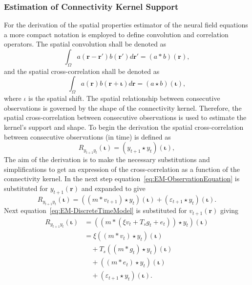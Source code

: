 \documentclass[]{article}
\begin{document}
\subsubsection{Estimation of Connectivity Kernel Support}
For the derivation of the spatial properties estimator of the neural field equations a more compact notation is employed to define convolution and correlation operators. The spatial convolution shall be denoted as
\begin{equation}
	\int_\Omega a(\mathbf{r}-\mathbf{r}')b(\mathbf{r}')d\mathbf{r}' = (a\ast b)(\mathbf{r}),
\end{equation}
and the spatial cross-correlation shall be denoted as 
\begin{equation}
	\int_\Omega a(\mathbf{r})b(\mathbf{r}+\boldsymbol{\iota})d\mathbf{r} = (a\star b)(\boldsymbol{\iota}),
\end{equation} 
where $\iota$ is the spatial shift. The spatial relationship between consecutive observations is governed by the shape of the connectivity kernel. Therefore, the spatial cross-correlation between consecutive observations is used to estimate the kernel's support and shape. To begin the derivation the spatial cross-correlation between consecutive observations (in time) is defined as
\begin{equation}
	R_{y_{t+1}y_t}(\boldsymbol{\iota}) = \left(y_{t+1}\star y_t\right)\left(\boldsymbol{\iota}\right),
\end{equation}
 The aim of the derivation is to make the necessary substitutions and simplifications to get an expression of the cross-correlation as a function of the connectivity kernel. In the next step equation~\eqref{eq:EM-ObservationEquation} is substituted for $y_{t+1}(\mathbf{r})$ and expanded to give
\begin{equation}
	R_{y_{t+1}y_t}\left(\boldsymbol{\iota}\right) = \left(\left(m \ast v_{t+1}\right)\star y_t\right)\left(\boldsymbol{\iota}\right) + \left(\varepsilon_{t+1} \star y_t\right)\left(\boldsymbol{\iota}\right).
\end{equation}
Next equation~\eqref{eq:EM-DiscreteTimeModel} is substituted for $v_{t+1}(\mathbf{r})$ giving 
\begin{align}
	R_{y_{t+1}y_t}(\boldsymbol{\iota}) &= (\left(m \ast \left(\xi v_t +  T_s g_t + e_t\right)\right) \star y_t)(\boldsymbol{\iota})\\
	&= \xi\left(\left(m \ast v_t\right) \star y_t \right)(\boldsymbol{\iota}) \nonumber\\
	&\quad+ T_s \left(\left(m\ast g_t\right)\star y_t \right)(\boldsymbol{\iota}) \nonumber\\
	&\quad+ \left(\left(m\ast e_t\right)\star y_t \right)(\boldsymbol{\iota}) \nonumber\\
	&\quad+ (\varepsilon_{t+1} \star y_t)(\boldsymbol{\iota}).
\end{align}
\end{document}
